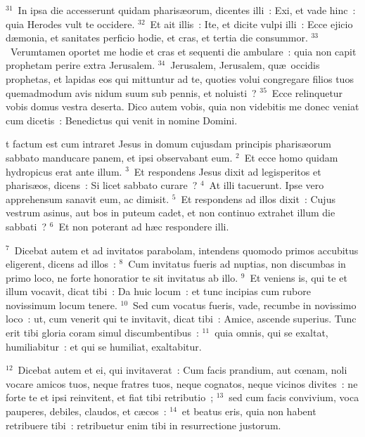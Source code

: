 ${}^{31}$~In ipsa die accesserunt quidam pharis\ae orum, dicentes illi~: Exi, et vade hinc~: quia Herodes vult te occidere.
${}^{32}$~Et ait illis~: Ite, et dicite vulpi illi~: Ecce ejicio d\ae monia, et sanitates perficio hodie, et cras, et tertia die consummor.
${}^{33}$~Verumtamen oportet me hodie et cras et sequenti die ambulare~: quia non capit prophetam perire extra Jerusalem.
${}^{34}$~Jerusalem, Jerusalem, qu\ae\ occidis prophetas, et lapidas eos qui mittuntur ad te, quoties volui congregare filios tuos quemadmodum avis nidum suum sub pennis, et noluisti~?
${}^{35}$~Ecce relinquetur vobis domus vestra deserta. Dico autem vobis, quia non videbitis me donec veniat cum dicetis~: Benedictus qui venit in nomine Domini.

\bchapter
{}t factum est cum intraret Jesus in domum cujusdam principis pharis\ae orum sabbato manducare panem, et ipsi observabant eum.
${}^{2}$~Et ecce homo quidam hydropicus erat ante illum.
${}^{3}$~Et respondens Jesus dixit ad legisperitos et pharis\ae os, dicens~: Si licet sabbato curare~?
${}^{4}$~At illi tacuerunt. Ipse vero apprehensum sanavit eum, ac dimisit.
${}^{5}$~Et respondens ad illos dixit~: Cujus vestrum asinus, aut bos in puteum cadet, et non continuo extrahet illum die sabbati~?
${}^{6}$~Et non poterant ad h\ae c respondere illi.


${}^{7}$~Dicebat autem et ad invitatos parabolam, intendens quomodo primos accubitus eligerent, dicens ad illos~:
${}^{8}$~Cum invitatus fueris ad nuptias, non discumbas in primo loco, ne forte honoratior te sit invitatus ab illo.
${}^{9}$~Et veniens is, qui te et illum vocavit, dicat tibi~: Da huic locum~: et tunc incipias cum rubore novissimum locum tenere.
${}^{10}$~Sed cum vocatus fueris, vade, recumbe in novissimo loco~: ut, cum venerit qui te invitavit, dicat tibi~: Amice, ascende superius. Tunc erit tibi gloria coram simul discumbentibus~:
${}^{11}$~quia omnis, qui se exaltat, humiliabitur~: et qui se humiliat, exaltabitur.


${}^{12}$~Dicebat autem et ei, qui invitaverat~: Cum facis prandium, aut cœnam, noli vocare amicos tuos, neque fratres tuos, neque cognatos, neque vicinos divites~: ne forte te et ipsi reinvitent, et fiat tibi retributio~;
${}^{13}$~sed cum facis convivium, voca pauperes, debiles, claudos, et c\ae cos~:
${}^{14}$~et beatus eris, quia non habent retribuere tibi~: retribuetur enim tibi in resurrectione justorum.


